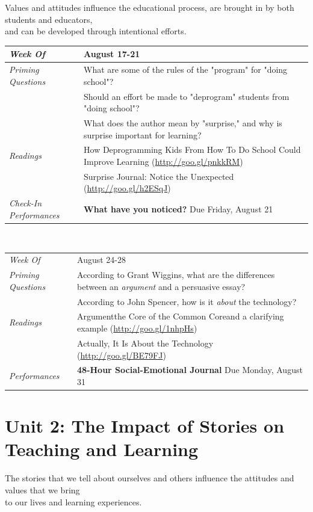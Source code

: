 \documentclass[two-side]{tufte-handout}
\newcommand{\gentopic}[1]{\begin{fullwidth}\begin{center}\faKey \textsf{#1}\end{center}\end{fullwidth}}
\newcommand{\tabpq}{\faQuestionCircle\medspace\textit{Priming Questions}}
\newcommand{\tabread}{\faBook\medspace\textit{Readings}}
\newcommand{\tabperformance}{\faTasks\medspace\textit{Performances}}
\newcommand{\tabdt}{\faCalendar\medspace\textit{Week Of}}
\newcommand{\tabcheckin}{\faCheckSquareO\medspace\textit{Check-In Performances}}
\newcommand{\tabbreak}{\begin{fullwidth}\begin{center}\faAsterisk\faAsterisk\faAsterisk\\\end{center}\end{fullwidth}}
\newenvironment{tabsched}
	{\small
	\begin{tabular}{p{1.5in}p{4.5in}}
	\midrule}
	{\midrule
	\end{tabular}
	\normalsize}
\newcommand{\weekone}{August 17-21}
\newcommand{\weektwo}{August 24-28}
\begin{document}
\gentopic{Values and attitudes influence the educational process, are brought in by both students and educators,\\and can be developed through intentional efforts.}


\begin{tabsched}
	\tabdt & \weekone \\
	\midrule
	\tabpq & What are some of the rules of the "program" for "doing school"? \\
	& Should an effort be made to "deprogram" students from "doing school"? \\
	& What does the author mean by "surprise," and why is surprise important for learning? \\
	\midrule
	\tabread & How Deprogramming Kids From How To Do School Could Improve Learning (\url{http://goo.gl/pnkkRM}) \\
	& Surprise Journal: Notice the Unexpected (\url{http://goo.gl/h2ESqJ}) \\
	\midrule
	\tabcheckin & \textbf{What have you noticed?} Due Friday, August 21 \\
\end{tabsched}

\tabbreak

\begin{tabsched}
	\tabdt & \weektwo \\
	\midure
	\tabpq & According to Grant Wiggins, what are the differences between an \emph{argument} and a persuasive essay? \\
	& According to John Spencer, how is it \emph{about} the technology? \\
	\midrule
	\tabread & Argument\textemdash{}the Core of the Common Core\textemdash{}and a clarifying example (\url{http://goo.gl/1nhpHs}) \\
	& Actually, It Is About the Technology (\url{http://goo.gl/BE79FJ}) \\
	\midrule
	\tabperformance & \textbf{48-Hour Social-Emotional Journal} Due Monday, August 31 \\
\end{tabsched}

	\section{Unit 2: The Impact of Stories on Teaching and Learning}

\gentopic{The stories that we tell about ourselves and others influence the attitudes and values that we bring\\to our lives and learning experiences.}
\end{document}
